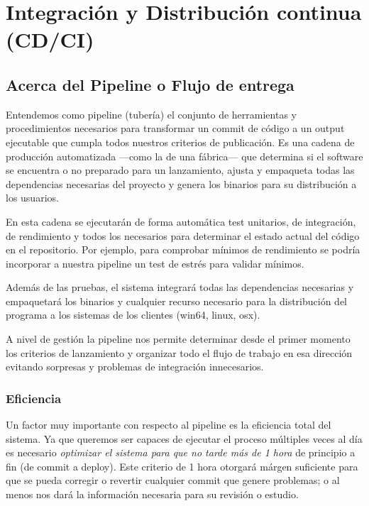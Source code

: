 
\section{Integración y Distribución continua (CD/CI)}\label{pipeline:entrega-continua}

\subsection{Acerca del Pipeline o Flujo de entrega}

Entendemos como pipeline (tubería) el conjunto de herramientas y procedimientos necesarios para transformar un commit de código a un output ejecutable que cumpla todos nuestros criterios de publicación. Es una cadena de producción automatizada ---como la de una fábrica--- que determina si el software se encuentra o no preparado para un lanzamiento, ajusta y empaqueta todas las dependencias necesarias del proyecto y genera los binarios para su distribución a los usuarios.

En esta cadena se ejecutarán de forma automática test unitarios, de integración, de rendimiento y todos los necesarios para determinar el estado actual del código en el repositorio. Por ejemplo, para comprobar mínimos de rendimiento se podría incorporar a nuestra pipeline un test de estrés para validar  mínimos.

Además de las pruebas, el sistema integrará todas las dependencias necesarias y empaquetará los binarios y cualquier recurso necesario para la distribución del programa a los sistemas de los clientes (win64, linux, osx).

A nivel de gestión la pipeline nos permite determinar desde el primer momento los criterios de lanzamiento y organizar todo el flujo de trabajo en esa dirección evitando sorpresas y problemas de integración innecesarios.

\subsubsection{Eficiencia}\label{pipeline:eficiencia}

Un factor muy importante con respecto al pipeline es la eficiencia total del sistema. Ya que queremos ser capaces de ejecutar el proceso múltiples veces al día es necesario \emph{optimizar el sistema para que no tarde más de 1 hora} de principio a fin (de commit a deploy). Este criterio de 1 hora otorgará márgen suficiente para que se pueda corregir o revertir cualquier commit que genere problemas; o al menos nos dará la información necesaria para su revisión o estudio.

